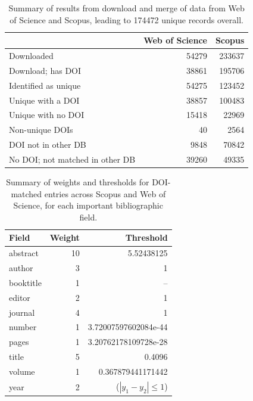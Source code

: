 \begin{table}[!t]
    \begin{tabular}{p{5cm}|r r}
        \toprule
         & Web of Science & Scopus \\
        \midrule
        Downloaded & 54279 & 233637 \\
        Download; has DOI & 38861 & 195706 \\
        Identified as unique & 54275 & 123452 \\
        Unique with a DOI & 38857 & 100483 \\
        Unique with no DOI & 15418 & 22969 \\
        Non-unique DOIs & 40 & 2564 \\
        DOI not in other DB & 9848 & 70842 \\
        No DOI; not matched in other DB & 39260 & 49335 \\
        \bottomrule
    \end{tabular}
    \caption{Summary of results from download and merge of data from Web of Science and Scopus, leading to 174472 unique records overall.}
    \label{tab:merge-summary}
\end{table}

\begin{table}[!t]
    \begin{tabular}{l|r|r}
        \toprule
        Field & Weight & Threshold \\
        \midrule
       abstract & 10 & 5.52438125 \\
       author & 3 & 1 \\
       booktitle & 1 & -- \\
       editor & 2 & 1 \\
       journal & 4 & 1 \\
       number & 1 & 3.72007597602084e-44 \\
       pages & 1 & 3.20762178109728e-28 \\
       title & 5 & 0.4096 \\
       volume & 1 & 0.367879441171442 \\
       year & 2 & ($|y_1 - y_2| \leq 1$) \\
        \bottomrule
    \end{tabular}
    \caption{Summary of weights and thresholds for DOI-matched entries across Scopus and Web of Science, for each important bibliographic field.}
    \label{tab:merge-thresholds}
\end{table}

